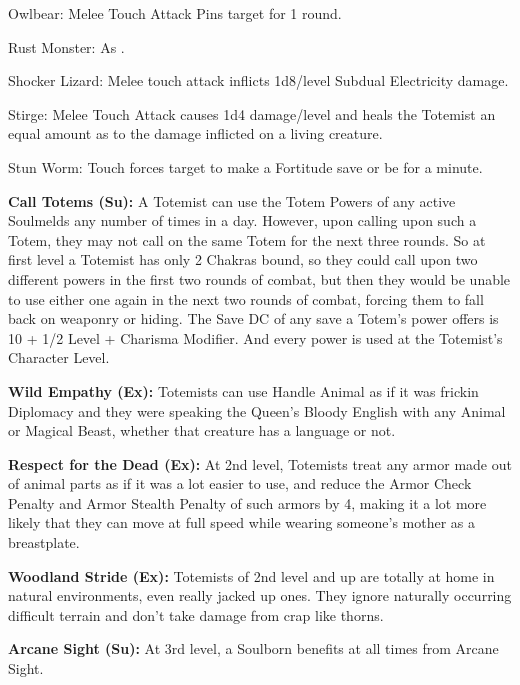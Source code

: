 \begin{description*}
\item[Owlbear:] Melee Touch Attack Pins target for 1 round.
\item[Rust Monster:] As .
\item[Shocker Lizard:] Melee touch attack inflicts 1d8/level Subdual Electricity damage.
\item[Stirge:] Melee Touch Attack causes 1d4 damage/level and heals the Totemist an equal amount as to the damage inflicted on a living creature.
\item[Stun Worm:] Touch forces target to make a Fortitude save or be  for a minute.
\end{description*}

\textbf{Call Totems (Su):} A Totemist can use the Totem Powers of any active Soulmelds any number of times in a day. However, upon calling upon such a Totem, they may not call on the same Totem for the next three rounds. So at first level a Totemist has only 2 Chakras bound, so they could call upon two different powers in the first two rounds of combat, but then they would be unable to use either one again in the next two rounds of combat, forcing them to fall back on weaponry or hiding. The Save DC of any save a Totem's power offers is 10 + 1/2 Level + Charisma Modifier. And every power is used at the Totemist's Character Level.

\textbf{Wild Empathy (Ex):} Totemists can use Handle Animal as if it was frickin Diplomacy and they were speaking the Queen's Bloody English with any Animal or Magical Beast, whether that creature has a language or not.

\textbf{Respect for the Dead (Ex):} At 2nd level, Totemists treat any armor made out of animal parts as if it was a lot easier to use, and reduce the Armor Check Penalty and Armor Stealth Penalty of such armors by 4, making it a lot more likely that they can move at full speed while wearing someone's mother as a breastplate.

\textbf{Woodland Stride (Ex):} Totemists of 2nd level and up are totally at home in natural environments, even really jacked up ones. They ignore naturally occurring difficult terrain and don't take damage from crap like thorns.

\textbf{Arcane Sight (Su):} At 3rd level, a Soulborn benefits at all times from Arcane Sight.

